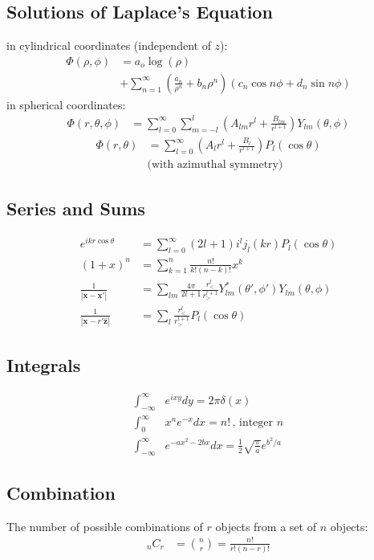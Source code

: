 \documentclass[10pt,twocolumn]{article}
\newcommand{\x}{\mathbf{x}}
\begin{document}
  \subsection*{Solutions of Laplace's Equation}
  in cylindrical coordinates (independent of $z$):
  \begin{align*}
    \Phi(\rho,\phi) &= a_o\log(\rho) \\
      & +\sum_{n=1}^\infty\left( \frac{a_n}{\rho^n} + b_n\rho^n
      \right)\left( c_n\cos n\phi + d_n\sin n\phi \right)
  \end{align*}
  in spherical coordinates:
  \begin{align*}
    \Phi(r,\theta,\phi) &= \sum_{l=0}^\infty\sum_{m=-l}^l\left(
      A_{lm}r^l + \frac{B_{lm}}{r^{l+1}} \right) Y_{lm}(\theta,\phi)
  \end{align*}
  \begin{align*}
    \Phi(r,\theta) &= \sum_{l=0}^\infty\left(
      A_lr^l + \frac{B_l}{r^{l+1}} \right) P_l(\cos\theta) \\
      &\text{(with azimuthal symmetry)}
  \end{align*}
  \subsection*{Series and Sums}
  \begin{align*}
    e^{ikr\cos\theta} &= \sum_{l=0}^\infty (2l+1)i^lj_l(kr)P_l(\cos\theta) \\
    (1+x)^n &= \sum_{k=1}^n \frac{n!}{k!(n-k)!}x^k \\
    \frac1{|\x - \x'|} &=
    \sum_{lm} \frac{4\pi}{2l+1} \frac{r_<^l}{r_>^{l+1}}
    Y_{lm}^*(\theta',\phi')
    Y_{lm}(\theta,\phi) \\
    \frac1{|\x - r'\mathbf{\hat{z}}|} &=
    \sum_{l} \frac{r_<^l}{r_>^{l+1}} P_l(\cos\theta)
  \end{align*}
  \subsection*{Integrals}
  \begin{align*}
    \int_{-\infty}^\infty & e^{ixy} dy = 2\pi\delta(x)\\
    \int_0^\infty & x^ne^{-x} dx = n!\,,\, \text{integer }n \\
    \int_{-\infty}^\infty & e^{-ax^2-2bx} dx = \frac{1}{2}\sqrt{\frac{\pi}{a}}e^{b^2/a}
  \end{align*}
  \subsection*{Combination}
  The number of possible combinations of $r$ objects from a set of $n$ objects:
  \begin{align*}
  _nC_r&=\binom{n}{r} = \frac{n!}{r!(n-r)!}
  \end{align*}
\end{document}
